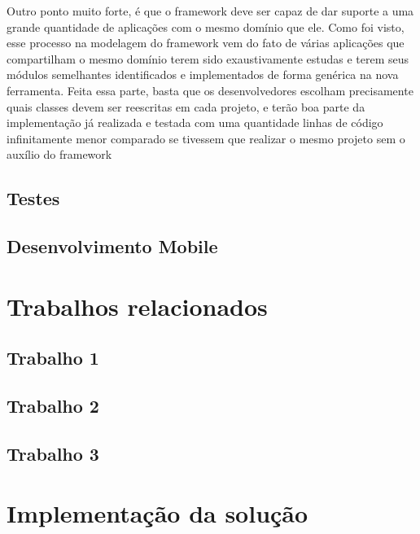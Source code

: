 \documentclass[
    12pt,       %
    openright,      %
    twoside,      %
    a4paper,      %
    english,      %
    french,       %
    spanish,      %
    brazil,       %
    ]{abntex2}
\begin{document}
          Outro ponto muito forte, é que o framework deve ser capaz de dar suporte a
          uma grande quantidade de aplicações com o mesmo domínio que ele. Como foi
          visto, esse processo na modelagem do framework vem do fato de várias
          aplicações que compartilham o mesmo domínio terem sido exaustivamente
          estudas e terem seus módulos semelhantes identificados e implementados
          de forma genérica na nova ferramenta. Feita essa parte, basta que
          os desenvolvedores escolham precisamente quais classes devem ser reescritas
          em cada projeto, e terão boa parte da implementação já realizada e testada
          com uma quantidade linhas de código infinitamente menor comparado se
          tivessem que realizar o mesmo projeto sem o auxílio do framework

  \chapter{Testes}

  \chapter{Desenvolvimento Mobile}

  \part{Trabalhos relacionados}

  \chapter{Trabalho 1}

  \chapter{Trabalho 2}

  \chapter{Trabalho 3}

  \part{Implementação da solução}
\end{document}
